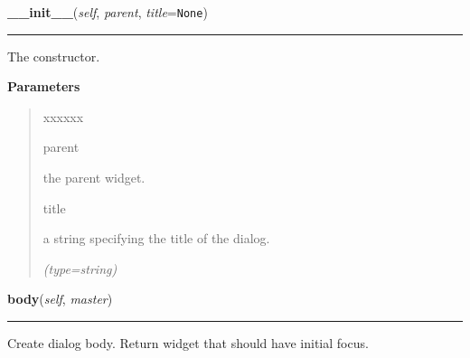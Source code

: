    \label{nMOLDYN:GUI:PreferencesDialog:PreferencesDialog:__init__}

    \vspace{0.5ex}

\hspace{.8\funcindent}\begin{boxedminipage}{\funcwidth}

    \raggedright \textbf{\_\_init\_\_}(\textit{self}, \textit{parent}, \textit{title}={\tt None})

    \vspace{-1.5ex}

    \rule{\textwidth}{0.5\fboxrule}
\setlength{\parskip}{2ex}
    The constructor.

\setlength{\parskip}{1ex}
      \textbf{Parameters}
      \vspace{-1ex}

      \begin{quote}
        \begin{Ventry}{xxxxxx}

          \item[parent]

          the parent widget.

          \item[title]

          a string specifying the title of the dialog.

            {\it (type=string)}

        \end{Ventry}

      \end{quote}

    \end{boxedminipage}

    \label{nMOLDYN:GUI:PreferencesDialog:PreferencesDialog:body}

    \vspace{0.5ex}

\hspace{.8\funcindent}\begin{boxedminipage}{\funcwidth}

    \raggedright \textbf{body}(\textit{self}, \textit{master})

    \vspace{-1.5ex}

    \rule{\textwidth}{0.5\fboxrule}
\setlength{\parskip}{2ex}
    Create dialog body. Return widget that should have initial focus.

\setlength{\parskip}{1ex}
    \end{boxedminipage}

